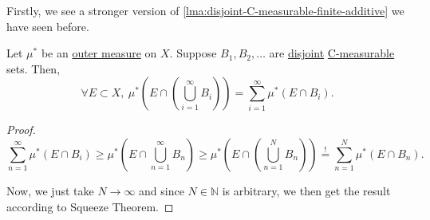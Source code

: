 Firstly, we see a stronger version of \autoref{lma:disjoint-C-measurable-finite-additive} we have seen before.
\begin{lemma}\label{lma:disjoint-C-measurable-infinite-additive}
	Let \(\mu^{\ast} \) be an \hyperref[def:outer-measure]{outer measure} on \(X\). Suppose \(B_1, B_2, \dots\) are \underline{disjoint} \hyperref[def:C-measurable]{C-measurable} sets.
	Then,
	\[
		\forall E\subset X,\ \mu^{\ast} \left(E\cap \left(\bigcup\limits_{i=1}^{\infty} B_{i}\right)\right) = \sum\limits_{i=1}^{\infty} \mu^{\ast} \left(E\cap B_i\right).
	\]
\end{lemma}
\begin{proof}
	\[
		\sum\limits_{n=1}^{\infty} \mu^{\ast} (E\cap B_{i}) \geq \mu^{\ast} \left(E\cap \bigcup\limits_{n=1}^{\infty} B_{n}\right) \geq\mu^{\ast} \left(E\cap \left(\bigcup\limits_{n=1}^{N} B_{n}\right)\right) \overset{\hyperref[lma:disjoint-C-measurable-finite-additive]{!}}{=} \sum\limits_{n=1}^{N} \mu^{\ast} \left(E\cap B_n\right).
	\]

	Now, we just take \(N\to \infty \) and since \(N\in\mathbb{N} \) is arbitrary, we then get the result according to Squeeze Theorem.
\end{proof}

